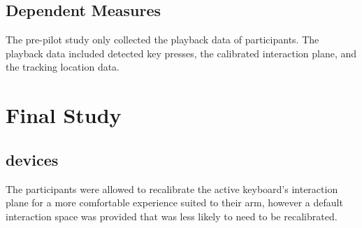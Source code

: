 \begin{table}[h]
	\centering
	\caption[Schedule of Assessments]{\centering Schedule of Assessments for a single study visit (in minutes).}
	\label{pre_schedule_of_assessments}
	\end{table}
	
	\subsection{Dependent Measures}
	
	The pre-pilot study only collected the playback data of participants. The playback data included detected key presses, the calibrated interaction plane, and the tracking location data.











\section{Final Study}

\subsection{devices}

The participants were allowed to recalibrate the active keyboard's interaction plane for a more comfortable experience suited to their arm, however a default interaction space was provided that was less likely to need to be recalibrated.

